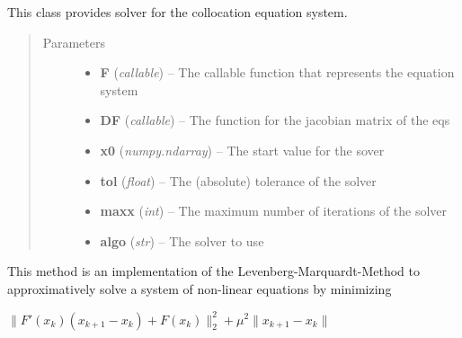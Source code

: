 \documentclass[letterpaper,10pt,english]{sphinxmanual}
\begin{document}
\begin{fulllineitems}
\label{pytrajectory:pytrajectory.solver.Solver}
This class provides solver for the collocation equation system.
\begin{quote}\begin{description}
\item[{Parameters}] \leavevmode\begin{itemize}
\item {} 
\textbf{F} (\emph{callable}) -- The callable function that represents the equation system

\item {} 
\textbf{DF} (\emph{callable}) -- The function for the jacobian matrix of the eqs

\item {} 
\textbf{x0} (\emph{numpy.ndarray}) -- The start value for the sover

\item {} 
\textbf{tol} (\emph{float}) -- The (absolute) tolerance of the solver

\item {} 
\textbf{maxx} (\emph{int}) -- The maximum number of iterations of the solver

\item {} 
\textbf{algo} (\emph{str}) -- The solver to use

\end{itemize}

\end{description}\end{quote}

\begin{fulllineitems}
\label{pytrajectory:pytrajectory.solver.Solver.gauss}
\end{fulllineitems}


\begin{fulllineitems}
\label{pytrajectory:pytrajectory.solver.Solver.leven}
This method is an implementation of the Levenberg-Marquardt-Method
to approximatively solve a system of non-linear equations by minimizing

\(\| F'(x_k)(x_{k+1} - x_k) + F(x_k) \|_2^2 + \mu^2 \|x_{k+1} - x_k \|\)


\end{fulllineitems}
\end{fulllineitems}
\end{document}
